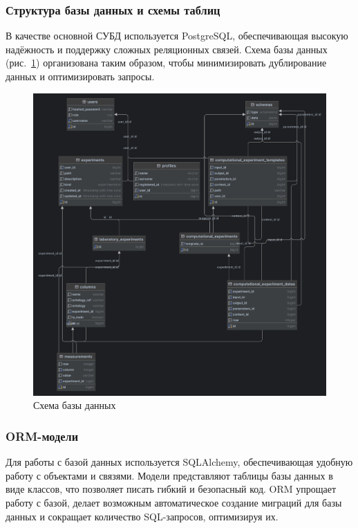 \subsubsection{Структура базы данных и схемы таблиц}

В качестве основной СУБД используется PostgreSQL, обеспечивающая высокую надёжность и поддержку сложных реляционных связей. Схема базы данных (рис.~\ref{pic:postgres_scheme}) организована таким образом, чтобы минимизировать дублирование данных и оптимизировать запросы.

\begin{figure}[H]
    \centering
    \includegraphics[width=\linewidth]{img/postgres_scheme.png}
    \caption{Схема базы данных}
    \label{pic:postgres_scheme}
\end{figure}
\vspace{0.5cm}

\subsubsection{ORM-модели}

Для работы с базой данных используется SQLAlchemy, обеспечивающая удобную работу с объектами и связями. Модели представляют таблицы базы данных в виде классов, что позволяет писать гибкий и безопасный код. ORM упрощает работу с базой, делает возможным автоматическое создание миграций для базы данных и сокращает количество SQL-запросов, оптимизируя их.

